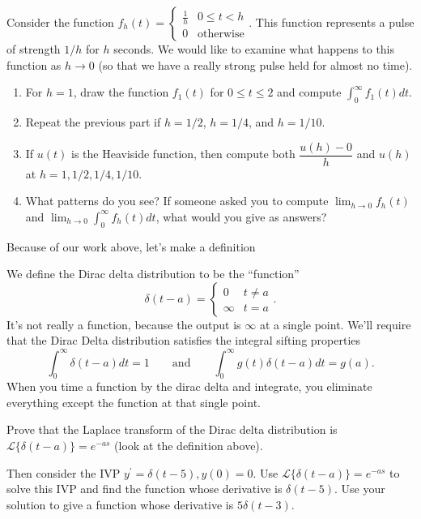 \begin{problem}
Consider the function $f_h(t) = 
\begin{cases}
 \frac{1}{h} & 0\leq t<h\\
0 & \text{otherwise}
\end{cases}.$ This function represents a pulse of strength $1/h$ for $h$ seconds.  We would like to examine what happens to this function as $h\to 0$ (so that we have a really strong pulse held for almost no time).
\begin{enumerate}
 \item For $h=1$, draw the function $f_1(t)$ for $0\leq t\leq 2$ and compute $\int_0^\infty f_1(t)dt$. 
 \item Repeat the previous part if $h=1/2$, $h=1/4$, and $h=1/10$.
 \item If $u(t)$ is the Heaviside function, then compute both $\dfrac{u(h)-0}{h}$ and $u(h)$ at $h=1,1/2,1/4,1/10$.
 \item What patterns do you see?  If someone asked you to compute $\lim_{h\to 0}f_h(t)$ and $\lim_{h\to 0}\int_0^\infty f_h(t)dt$, what would you give as answers?
\end{enumerate}
\end{problem}

Because of our work above, let's make a definition
\begin{definition}
We define the Dirac delta distribution to be the ``function'' 
$$\delta(t-a) = \begin{cases}0 &t\neq a\\\infty &t=a\end{cases}.$$ 
It's not really a function, because the output is $\infty$ at a single point.
We'll require that the Dirac Delta distribution satisfies the integral sifting properties
$$\int_0^\infty \delta(t-a)dt = 1 \quad \quad \text{and}\quad\quad \int_0^\infty g(t)\delta(t-a)dt = g(a).$$
When you time a function by the dirac delta and integrate, you eliminate everything except the function at that single point.
\end{definition}

\begin{problem}[$\mathscr{L}\{\delta(t-a)\} = e^{-as}$]
Prove that the  Laplace transform of the Dirac delta distribution is $\mathscr{L}\{\delta(t-a)\} = e^{-as}$ (look at the definition above).

Then consider the IVP $y^\prime = \delta(t-5),y(0)=0$.  Use $\mathscr{L}\{\delta(t-a)\} = e^{-as}$ to solve this IVP and find the function whose derivative is $\delta(t-5)$. Use your solution to give a function whose derivative is $5\delta(t-3)$. 
\end{problem}

